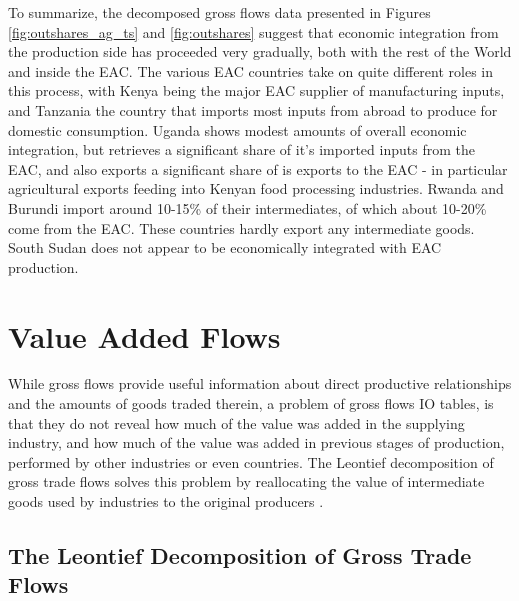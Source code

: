 \documentclass[a4paper]{article}
\begin{document}
To summarize, the decomposed gross flows data presented in Figures \ref{fig:outshares_ag_ts} and \ref{fig:outshares} suggest that economic integration from the production side has proceeded very gradually, both with the rest of the World and inside the EAC. The various EAC countries take on quite different roles in this process, with Kenya being the major EAC supplier of manufacturing inputs, and Tanzania the country that imports most inputs from abroad to produce for domestic consumption. Uganda shows modest amounts of overall economic integration, but retrieves a significant share of it's imported inputs from the EAC, and also exports a significant share of is exports to the EAC - in particular agricultural exports feeding into Kenyan food processing industries. Rwanda and Burundi import around 10-15\% of their intermediates, of which about 10-20\% come from the EAC. These countries hardly export any intermediate goods. South Sudan does not appear to be economically integrated with EAC production. 


\section{Value Added Flows}
While gross flows provide useful information about direct productive relationships and the amounts of goods traded therein, a problem of gross flows IO tables, is that they do not reveal how much of the value was added in the supplying industry, and how much of the value was added in previous stages of production, performed by other industries or even countries. %
The Leontief decomposition of gross trade flows solves this problem by reallocating the value of intermediate goods used by industries to the original producers \citep{Kummritz2014}. %

\subsection{The Leontief Decomposition of Gross Trade Flows}
\end{document}
